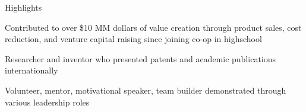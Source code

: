 \documentclass{resume} %
\begin{document}

\begin{rSection}{Highlights}
\item Contributed to over \$10 MM dollars of value creation through product sales, cost reduction, and venture capital raising since joining co-op in highschool
\item Researcher and inventor who presented patents and academic publications internationally
\item Volunteer, mentor, motivational speaker, team builder demonstrated through various leadership roles
\end{rSection}

\end{document}
